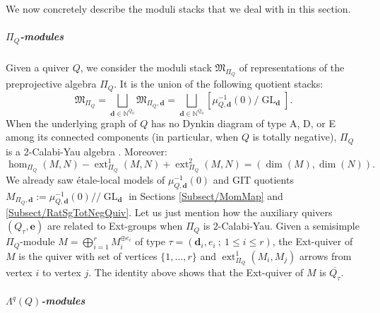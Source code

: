 \documentclass[11pt,english]{article}
\numberwithin{equation}{section}
\numberwithin{figure}{section}
\theoremstyle{definition}
\theoremstyle{plain}
\theoremstyle{remark}
\DeclareMathOperator{\ext}{ext}
\DeclareMathOperator{\GL}{GL}
\newcommand\dd{\mathbf{d}}
\newcommand\ee{\mathbf{e}}
\newcommand\git{/\!\!/}
\begin{document}
We now concretely describe the moduli stacks that we deal with in
this section.

\subparagraph*{$\Pi_{Q}$-modules}

Given a quiver $Q$, we consider the moduli stack $\mathfrak{M}_{\Pi_{Q}}$
of representations of the preprojective algebra $\Pi_{Q}$. It is
the union of the following quotient stacks:\[
\mathfrak{M}_{\Pi_Q}
=\bigsqcup_{\dd\in\mathbb{N}^{Q_0}}\mathfrak{M}_{\Pi_Q,\dd}
=\bigsqcup_{\dd\in\mathbb{N}^{Q_0}}\left[\mu_{Q,\dd}^{-1}(0)/\GL_{\dd}\right].
\]When the underlying graph of $Q$ has no Dynkin diagram of type A,
D, or E among its connected components (in particular, when $Q$ is
totally negative), $\Pi_{Q}$ is a 2-Calabi-Yau algebra \cite[\S 4.2.]{Kel08}.
Moreover:\[
\hom_{\Pi_Q}(M,N)-\ext_{\Pi_Q}^1(M,N)+\ext_{\Pi_Q}^2(M,N)=(\dim(M),\dim(N)).
\]We already saw étale-local models of $\mu_{Q,\dd}^{-1}(0)$ and GIT
quotients $M_{\Pi_{Q},\dd}:=\mu_{Q,\dd}^{-1}(0)\git\GL_{\dd}$ in
Sections \ref{Subsect/MomMap} and \ref{Subsect/RatSgTotNegQuiv}.
Let us just mention how the auxiliary quivers $(Q_{\tau},\ee)$ are
related to Ext-groups when $\Pi_{Q}$ is $2$-Calabi-Yau. Given a
semisimple $\Pi_{Q}$-module $M=\bigoplus_{i=1}^{r}M_{i}^{\oplus e_{i}}$
of type $\tau=(\dd_{i},e_{i}\ ;\ 1\leq i\leq r)$, the Ext-quiver
of $M$ is the quiver with set of vertices $\{1,\ldots,r\}$ and $\ext_{\Pi_{Q}}^{1}(M_{i},M_{j})$
arrows from vertex $i$ to vertex $j$. The identity above shows that
the Ext-quiver of $M$ is $\overline{Q_{\tau}}$.

\subparagraph*{$\Lambda^{q}(Q)$-modules}
\end{document}
